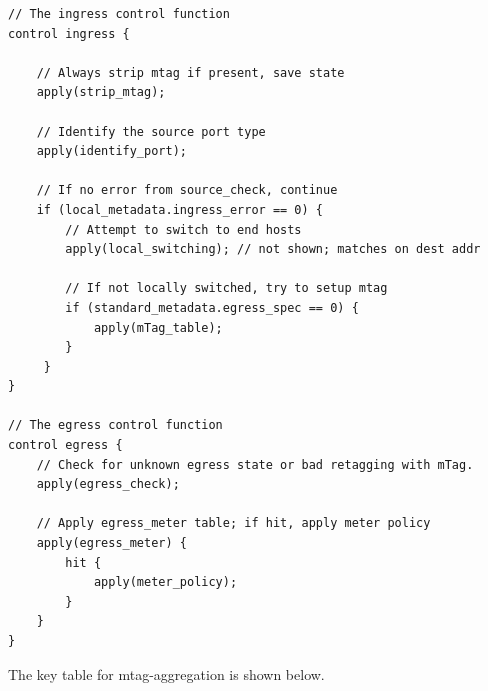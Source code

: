 \documentclass[12pt]{article}
\begin{document}
\begin{lstlisting}[style=P4style]
// The ingress control function
control ingress {

    // Always strip mtag if present, save state
    apply(strip_mtag);

    // Identify the source port type
    apply(identify_port);

    // If no error from source_check, continue
    if (local_metadata.ingress_error == 0) {
        // Attempt to switch to end hosts
        apply(local_switching); // not shown; matches on dest addr

        // If not locally switched, try to setup mtag
        if (standard_metadata.egress_spec == 0) {
            apply(mTag_table);
        }
     }
}

// The egress control function
control egress {
    // Check for unknown egress state or bad retagging with mTag.
    apply(egress_check);

    // Apply egress_meter table; if hit, apply meter policy
    apply(egress_meter) {
        hit {
            apply(meter_policy);
        }
    }
}
\end{lstlisting}

The key table for mtag-aggregation is shown below.
\end{document}
